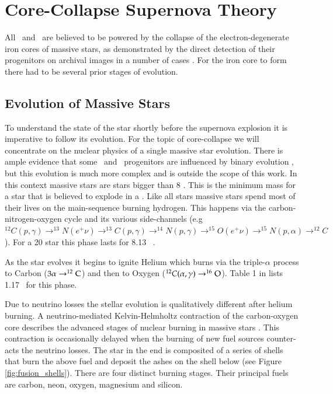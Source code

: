 \newpage
\section{Core-Collapse Supernova Theory}

All \snii\ and \snibc\ are believed to be powered by the collapse of the electron-degenerate iron cores of massive stars, as demonstrated by the direct detection of their progenitors on archival images in a number of cases \citep[for a review see][]{2009ARA&A..47...63S}. For the iron core to form there had to be several prior stages of evolution.

\subsection{Evolution of Massive Stars}  To understand the state of the star shortly before the supernova explosion it is imperative to follow its evolution. For the topic of core-collapse we will concentrate on the nuclear physics of a single massive star evolution. There is ample evidence that some \snii\ and \snibc\ progenitors are influenced by binary evolution \citep{1992ApJ...391..246P}, but this evolution is much more complex and is outside the scope of this work.  In this context massive stars are stars bigger than 8 \msun. This is the minimum mass for a star that is believed to explode in a \snii. Like all stars massive stars spend most of their lives on the main-sequence burning hydrogen. This happens via the carbon-nitrogen-oxygen cycle and its various side-channels (e.g $^{12}C(p,\gamma)\rightarrow^{13}N(e^+\nu)\rightarrow^{13}C(p,\gamma)\rightarrow^{14}N(p,\gamma)\rightarrow^{15}O(e^+\nu)\rightarrow^{15}N(p,\alpha)\rightarrow^{12}C$). For a 20 \msun star this phase lasts for 8.13 \myr\ \citep[see][]{2002RvMP...74.1015W}.

As the star evolves it begins to ignite Helium which burns via the triple-$\alpha$ process to Carbon ($3\alpha\rightarrow^{12}\textrm{C}$) and then to Oxygen ($^{12}C(\alpha,\gamma)\rightarrow^{16}\textrm{O}$). Table 1 in \citet{2002RvMP...74.1015W} lists 1.17 \myr\ for this phase. 

Due to neutrino losses the stellar evolution is qualitatively different after helium burning. A neutrino-mediated Kelvin-Helmholtz contraction of the carbon-oxygen core describes the advanced stages of nuclear burning in massive stars \citep{2002RvMP...74.1015W}. This contraction is occasionally delayed when the burning of new fuel sources counter-acts the neutrino losses. The star in the end is composited of a series of shells that burn the above fuel and deposit the ashes on the shell below (see Figure \ref{fig:fusion_shells}). There are four distinct burning stages. Their principal fuels are carbon, neon, oxygen, magnesium and silicon.

